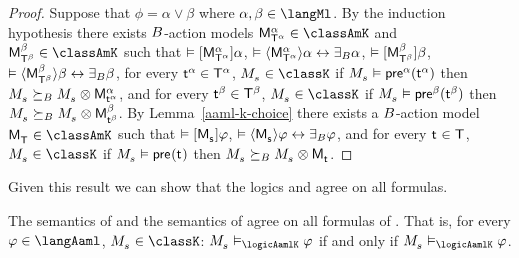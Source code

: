\begin{proof}
Suppose that $\phi = \alpha \lor \beta$ where $\alpha, \beta \in \langMl$.
By the induction hypothesis there exists $\agentsB$-action models
$\aPModel[\alpha]{\aStatesT[\alpha]} \in \classAmK$ and $\aPModel[\beta]{\aStatesT[\beta]} \in \classAmK$ such that 
$\entails \actionA{\aPModel[\alpha]{\aStatesT[\alpha]}} \alpha$, 
$\entails \actionE{\aPModel[\alpha]{\aStatesT[\alpha]}} \alpha \iff \someactsBs \alpha$, 
$\entails \actionA{\aPModel[\beta]{\aStatesT[\beta]}} \beta$,
$\entails \actionE{\aPModel[\beta]{\aStatesT[\beta]}} \beta \iff \someactsBs \beta$,
for every $\aStateT[\alpha] \in \aStatesT[\alpha]$, $\kPModel{\kStateS} \in \classK$ if $\kPModel{\kStateS} \entails \aPrecondition[\alpha](\aStateT[\alpha])$ then $\kPModel{\kStateS} \simulatesBs \kPModel{\kStateS} \exec \aPModel[\alpha]{\aStateT[\alpha]}$, and
for every $\aStateT[\beta] \in \aStatesT[\beta]$, $\kPModel{\kStateS} \in \classK$ if $\kPModel{\kStateS} \entails \aPrecondition[\beta](\aStateT[\beta])$ then $\kPModel{\kStateS} \simulatesBs \kPModel{\kStateS} \exec \aPModel[\beta]{\aStateT[\beta]}$.
By Lemma~\ref{aaml-k-choice} there exists a $\agentsB$-action model $\aPModel{\aStatesT} \in \classAmK$ such that 
$\entails \actionA{\aPModel{\aStateS}} \phi$,
$\entails \actionE{\aPModel{\aStateS}} \phi \iff \someactsBs \phi$, and
for every $\aStateT \in \aStatesT$, $\kPModel{\kStateS} \in \classK$ if $\kPModel{\kStateS} \entails \aPrecondition(\aStateT)$ then $\kPModel{\kStateS} \simulatesBs \kPModel{\kStateS} \exec \aPModel{\aStateT}$.
\end{proof}

Given this result we can show that the logics \logicAamlK{} and \logicRamlK{} agree on all \langAaml{} formulas.

\begin{theorem}\label{aaml-k-semantics-equivalent}
The semantics of \logicAamlK{} and the semantics of \logicRamlK{} agree on all formulas of \langAaml{}.
That is, for every $\phi \in \langAaml$, $\kPModel{\kStateS} \in \classK$: $\kPModel{\kStateS} \entails_\logicAamlK \phi$ if and only if $\kPModel{\kStateS} \entails_\logicAamlK \phi$.
\end{theorem}

